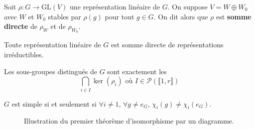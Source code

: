   \begin{definition}
    Soit $\rho : G \rightarrow \mathrm{GL}(V)$ une représentation linéaire de $G$. On suppose $V = W \oplus W_0$ avec $W$ et $W_0$ stables par $\rho(g)$ pour tout $g \in G$. On dit alors que $\rho$ est \textbf{somme directe} de $\rho_W$ et de $\rho_{W_0}$.
  \end{definition}

  \begin{theorem}[Maschke]
    Toute représentation linéaire de $G$ est somme directe de représentations irréductibles.
  \end{theorem}


  \begin{theorem}
    Les sous-groupes distingués de $G$ sont exactement les
    \[ \bigcap_{i \in I} \ker(\rho_i) \text{ où } I \in \mathcal{P}(\llbracket 1, r \rrbracket) \]
  \end{theorem}

  \begin{corollary}
    $G$ est simple si et seulement si $\forall i \neq 1$, $\forall g \neq e_G$, $\chi_i(g) \neq \chi_i(e_G)$.
  \end{corollary}

  \annexessection


  \begin{figure}[h]
    \begin{center}
    \end{center}
    \caption{Illustration du premier théorème d'isomorphisme par un diagramme.}
  \end{figure}

